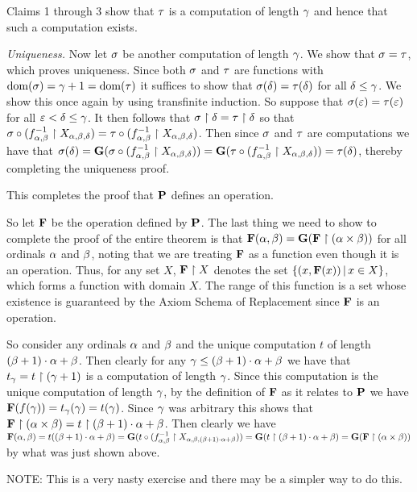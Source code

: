 \begin{solution}
    Claims 1 through 3 show that $\t$ is a computation of length $\g$ and hence that such a computation exists.

    \emph{Uniqueness.} Now let $\s$ be another computation of length $\g$.
    We show that $\s = \t$, which proves uniqueness.
    Since both $\s$ and $\t$ are functions with $\dom(\s) = \g+1 = \dom(\t)$ it suffices to show that $\s(\d) = \t(\d)$ for all $\d \leq \g$.
    We show this once again by using transfinite induction.
    So suppose that $\s(\e) = \t(\e)$ for all $\e < \d \leq \g$.
    It then follows that $\s \rest \d = \t \rest \d$ so that $\s \circ (\inv{f_{\a,\b}} \rest X_{\a,\b,\d}) = \t \circ (\inv{f_{\a,\b}} \rest X_{\a,\b,\d})$.
    Then since $\s$ and $\t$ are computations we have that $\s(\d) = \G(\s \circ (\inv{f_{\a,\b}} \rest X_{\a,\b,\d})) = \G(\t \circ (\inv{f_{\a,\b}} \rest X_{\a,\b,\d})) = \t(\d)$, thereby completing the uniqueness proof.

    This completes the proof that $\P$ defines an operation.

    So let $\F$ be the operation defined by $\P$.
    The last thing we need to show to complete the proof of the entire theorem is that $\F(\a, \b) = \G(\F \rest (\a \times \b))$ for all ordinals $\a$ and $\b$, noting that we are treating $\F$ as a function even though it is an operation.
    Thus, for any set $X$, $\F \rest X$ denotes the set $\braces{(x, \F(x)) \where x \in X}$, which forms a function with domain $X$.
    The range of this function is a set whose existence is guaranteed by the Axiom Schema of Replacement since $\F$ is an operation.

    So consider any ordinals $\a$ and $\b$ and the unique computation $t$ of length $(\b+1)\cdot\a + \b$.
    Then clearly for any $\g \leq (\b+1)\cdot\a + \b$ we have that $t_\g = t \rest (\g+1)$ is a computation of length $\g$.
    Since this computation is the unique computation of length $\g$, by the definition of $\F$ as it relates to $\P$ we have $\F(f(\g)) = t_\g(\g) = t(\g)$.
    Since $\g$ was arbitrary this shows that $\F \rest (\a \times \b) = t \rest (\b+1)\cdot\a + \b$.
    Then clearly we have $\F(\a, \b) = t((\b+1)\cdot\a + \b) = \G(t \circ (\inv{f_{\a,\b}} \rest X_{\a,\b,(\b+1)\cdot\a + \b})) = \G(t \rest (\b+1)\cdot\a + \b) = \G(\F \rest (\a \times \b))$ by what was just shown above. \qedsymbol

    NOTE: This is a very nasty exercise and there may be a simpler way to do this.
\end{solution}

